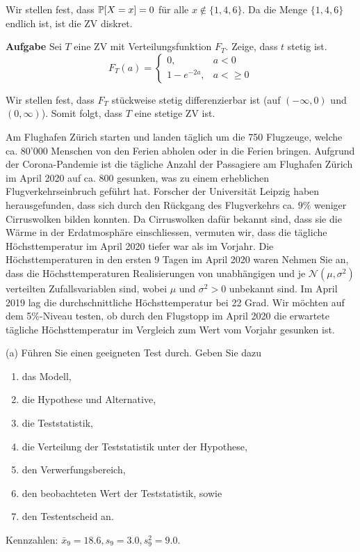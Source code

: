 Wir stellen fest, dass $\mathbb{P}[X = x] = 0$ für alle $x \notin \{1,4,6\}$. Da die Menge $\{1,4,6\}$ endlich ist, ist die ZV diskret.

\hrulefill

\textbf{Aufgabe}
Sei $T$ eine ZV mit Verteilungsfunktion $F_T$. Zeige, dass $t$ stetig ist.
$$ F_T(a) = \begin{cases}
	0, 				& a < 0 \\
	1 - e^{-2a}, 	& a < \geq 0
\end{cases}$$ \medskip

Wir stellen fest, dass $F_T$ stückweise stetig differenzierbar ist (auf $(-\infty, 0)$ und $(0, \infty)$). Somit folgt, dass $T$ eine stetige ZV ist.

\hrulefill

Am Flughafen Zürich starten und landen täglich um die 750 Flugzeuge, welche ca. 80'000 Menschen von den Ferien abholen oder in die Ferien bringen. Aufgrund der Corona-Pandemie ist die tägliche Anzahl der Passagiere am Flughafen Zürich im April 2020 auf ca. 800 gesunken, was zu einem erheblichen Flugverkehrseinbruch geführt hat. Forscher der Universität Leipzig haben herausgefunden, dass sich durch den Rückgang des Flugverkehrs ca. $9 \%$ weniger Cirruswolken bilden konnten. Da Cirruswolken dafür bekannt sind, dass sie die Wärme in der Erdatmosphäre einschliessen, vermuten wir, dass die tägliche Höchsttemperatur im April 2020 tiefer war als im Vorjahr. Die Höchsttemperaturen in den ersten 9 Tagen im April 2020 waren
Nehmen Sie an, dass die Höchsttemperaturen Realisierungen von unabhängigen und je $\mathcal{N}\left(\mu, \sigma^{2}\right)$ verteilten Zufallsvariablen sind, wobei $\mu$ und $\sigma^{2}>0$ unbekannt sind. Im April 2019 lag die durchschnittliche Höchsttemperatur bei 22 Grad. Wir möchten auf dem 5\%-Niveau testen, ob durch den Flugstopp im April 2020 die erwartete tägliche Höchsttemperatur im Vergleich zum Wert vom Vorjahr gesunken ist.

(a) Führen Sie einen geeigneten Test durch. Geben Sie dazu
\begin{enumerate}[label=\roman*]
	\item das Modell,
	\item die Hypothese und Alternative,
	\item die Teststatistik,
	\item die Verteilung der Teststatistik unter der Hypothese,
	\item den Verwerfungsbereich,
	\item den beobachteten Wert der Teststatistik, sowie
	\item den Testentscheid an.
\end{enumerate}
Kennzahlen: $\bar{x}_{9}=18.6, s_{9}=3.0, s_{9}^{2}=9.0$.

